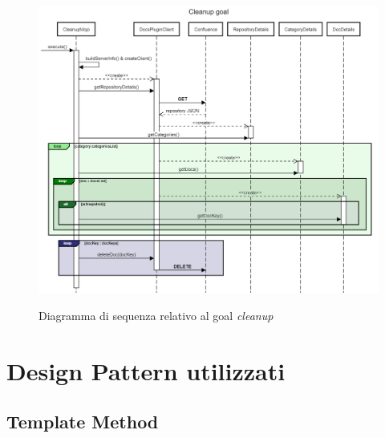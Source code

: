 \begin{figure}[H]
    \centering
    \includegraphics[width=\textwidth]{immagini/SequenceCleanupConfluence.png}\\
    \caption{Diagramma di sequenza relativo al goal \emph{cleanup}}
\end{figure}






\section{Design Pattern utilizzati}

\subsection{Template Method}

